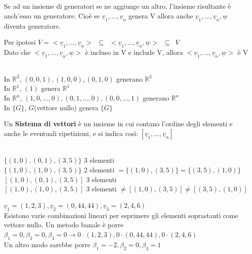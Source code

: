 \begin{nota}
	Se ad un insieme di generatori se ne aggiunge un altro, l'insieme risultante è anch'esso un generatore. Cioè se $\underline{v}_1,...,\underline{v}_n$ genera V allora anche $\underline{v}_1,...,\underline{v}_n,\underline{w}$ diventa generatore.
	\begin{dimostrazione}
		Per ipotesi $V=<\underline{v}_1,...,\underline{v}_n>\phantom{1}\subseteq\phantom{1}<\underline{v}_1,...,\underline{v}_n,\underline{w}>\phantom{1}\subseteq\phantom{1} V$\\
		Dato che $<\underline{v}_1,...,\underline{v}_n,\underline{w}>$ è incluso in V e include V, allora $<\underline{v}_1,...,\underline{v}_n,\underline{w}>$ è V\\
		\begin{es}
			\phantom{}\\
			In $\mathbb{R}^3$, $(0,0,1),(1,0,0),(0,1,0)$ generano $\mathbb{R}^3$\\
			In $\mathbb{R}^1$, $(1)$ genera $\mathbb{R}^1$\\
			In $\mathbb{R}^n$, $(1,0,...,0),(0,1,...,0),(0,0,...,1)$ generano $\mathbb{R}^n$\\
			In $\{G\}$, $G$(vettore nullo) genera $\{G\}$ 
		\end{es}
	\end{dimostrazione}
\end{nota}

Un \textbf{Sistema di vettori} è un insieme in cui contano l'ordine degli elementi e anche le eventuali ripetizioni, e si indica così: $[\underline{v}_1,...,\underline{v}_n]$
\begin{es}
	\phantom{}\\
	$\{(1,0),(0,1),(3,5)\}$ 3 elementi\\
	$\{(1,0),(1,0),(3,5)\}$ 2 elementi $=\{(1,0),(3,5)\}=\{(3,5),(1,0)\}$\\
	$[(1,0),(0,1),(3,5)]$ 3 elementi\\
	$[(1,0),(1,0),(3,5)]$ 3 elementi $\neq[(1,0),(3,5)]\neq[(3,5),(1,0)]$ 
\end{es}
\begin{nota}
$\underline{v}_1=(1,2,3), \underline{v}_2=(0,44,44), \underline{v}_3=(2,4,6)$\\
Esistono varie combinazioni lineari per esprimere gli elementi soprastanti come vettore nullo. Un metodo banale è porre $\beta_1=0,\beta_2=0,\beta_3=0 \longrightarrow 0\cdot(1,2,3),0\cdot(0,44,44), 0\cdot(2,4,6)$\\
Un altro modo sarebbe porre $\beta_1=-2,\beta_2=0,\beta_3=1$
\end{nota}


